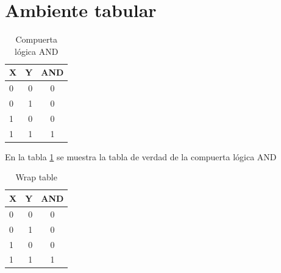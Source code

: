 \documentclass{article}
\begin{document}
\section{Ambiente tabular}

\begin{table}[h]
	\centering
	\begin{tabular}{lr|c}
		X	&	Y	&	AND\\
		\hline
		0	& 	0	&	0\\
		0	& 	1	&	0\\
		1	& 	0	&	0\\
		1	& 	1	&	1\\
	\end{tabular}
\caption{Compuerta lógica AND}
\label{Tab:AND}
\end{table}

En la tabla \ref{Tab:AND} se muestra la tabla de verdad de la compuerta lógica AND

\begin{table}
	\centering
	\begin{tabular}{lr|c}
		X	&	Y	&	AND\\
		\hline
		0	& 	0	&	0\\
		0	& 	1	&	0\\
		1	& 	0	&	0\\
		1	& 	1	&	1\\
	\end{tabular}
	\caption{Wrap table}
\end{table}
\lipsum
\end{document}
